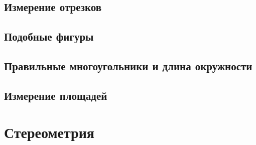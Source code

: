 \documentclass[twoside]{book}
\begin{document}
\chapter{Измерение отрезков}



\chapter{Подобные фигуры}








\chapter[Правильные многоугольники]{Правильные многоугольники и длина окружности}



\chapter{Измерение площадей}




\part{Стереометрия}




{\scriptsize
\printindex
}



\tableofcontents


\end{document}
